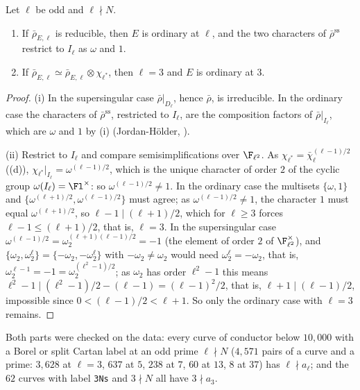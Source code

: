 \begin{corollary}\label{cor:galrep:ordinary}
Let $\ell$ be odd and $\ell\nmid N$.
\begin{enumerate}[label=(\roman*)]
\item If $\bar\rho_{E,\ell}$ is reducible, then $E$ is ordinary at $\ell$, and the two characters of $\bar\rho^{\mathrm{ss}}$ restrict to $I_\ell$ as $\omega$ and $1$.
\item If $\bar\rho_{E,\ell}\simeq\bar\rho_{E,\ell}\otimes\chi_{\ell^*}$, then $\ell=3$ and $E$ is ordinary at $3$.
\end{enumerate}
\end{corollary}

\begin{proof}
(i) In the supersingular case $\bar\rho|_{D_\ell}$, hence $\bar\rho$, is irreducible. In the ordinary case the characters of $\bar\rho^{\mathrm{ss}}$, restricted to $I_\ell$, are
the composition factors of $\bar\rho|_{I_\ell}$, which are $\omega$ and $1$ by (i) (Jordan-H\"older, ).

(ii) Restrict to $I_\ell$ and compare semisimplifications over $\F_{\ell^2}$. As $\chi_{\ell^*}=\bar\chi_\ell^{(\ell-1)/2}$ ((d)),
$\chi_{\ell^*}|_{I_\ell}=\omega^{(\ell-1)/2}$, which is the unique character of order $2$ of the cyclic group $\omega(I_\ell)=\Fl^\times$: so $\omega^{(\ell-1)/2}\ne1$. In the ordinary
case the multisets $\{\omega,1\}$ and $\{\omega^{(\ell+1)/2},\omega^{(\ell-1)/2}\}$ must agree; as $\omega^{(\ell-1)/2}\ne1$, the character $1$ must equal $\omega^{(\ell+1)/2}$, so
$\ell-1\mid(\ell+1)/2$, which for $\ell\ge3$ forces $\ell-1\le(\ell+1)/2$, that is, $\ell=3$. In the supersingular case $\omega^{(\ell-1)/2}=\omega_2^{(\ell+1)(\ell-1)/2}=-1$ (the
element of order $2$ of $\F_{\ell^2}^\times$), and $\{\omega_2,\omega_2^\ell\}=\{-\omega_2,-\omega_2^\ell\}$ with $-\omega_2\ne\omega_2$ would need $\omega_2^\ell=-\omega_2$, that is,
$\omega_2^{\ell-1}=-1=\omega_2^{(\ell^2-1)/2}$; as $\omega_2$ has order $\ell^2-1$ this means $\ell^2-1\mid(\ell^2-1)/2-(\ell-1)=(\ell-1)^2/2$, that is, $\ell+1\mid(\ell-1)/2$,
impossible since $0<(\ell-1)/2<\ell+1$. So only the ordinary case with $\ell=3$ remains.
\end{proof}

Both parts were checked on the data: every curve of conductor below $10{,}000$ with a Borel or split Cartan label at an odd prime
$\ell\nmid N$ ($4{,}571$ pairs of a curve and a prime: $3{,}628$ at $\ell=3$, $637$ at $5$, $238$ at $7$, $60$ at $13$, $8$ at $37$) has $\ell\nmid a_\ell$; and the
$62$ curves with label \texttt{3Ns} and $3\nmid N$ all have $3\nmid a_3$.

